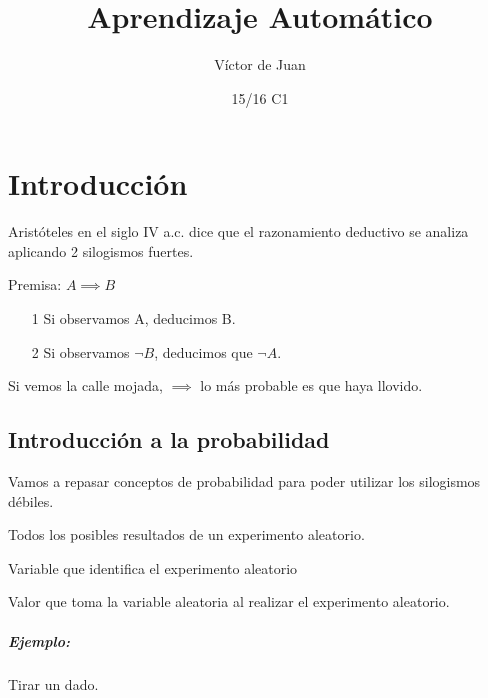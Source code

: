 \documentclass{apuntes}
\title{Aprendizaje Automático}
\author{Víctor de Juan}
\date{15/16 C1}
\begin{document}
\pagestyle{plain}
\maketitle

\tableofcontents
\newpage

\chapter{Introducción}


Aristóteles en el siglo IV a.c. dice que el razonamiento deductivo se analiza aplicando 2 silogismos fuertes.

\begin{defn} Premisa:  $A \implies B$
\begin{itemize}
\item[1] Si observamos A, deducimos B.
\item[2] Si observamos $\neg B$, deducimos que $\neg A$.
\end{itemize}
\end{defn}

\begin{defn} 
Si vemos la calle mojada, $\implies$ lo más probable es que haya llovido.
\end{defn}


\section{Introducción a la probabilidad}

Vamos a repasar conceptos de probabilidad para poder utilizar los silogismos débiles.

\begin{defn}[dominio]
Todos los posibles resultados de un experimento aleatorio.
\end{defn}

\begin{defn}
Variable que identifica el experimento aleatorio
\end{defn}

\begin{defn}[Suceso]
Valor que toma la variable aleatoria al realizar el experimento aleatorio.
\end{defn}

\paragraph{Ejemplo:} Tirar un dado.
\end{document}
